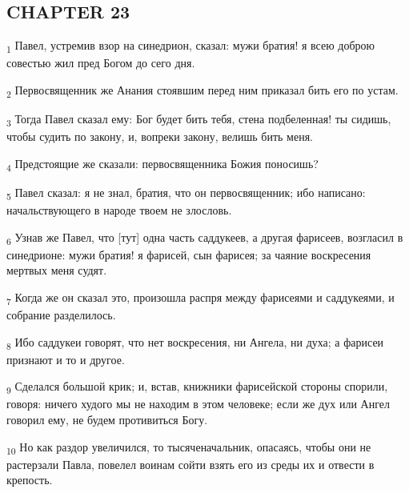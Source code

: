 \subsection{CHAPTER 23}
\begin{tcolorbox}
\textsubscript{1} Павел, устремив взор на синедрион, сказал: мужи братия! я всею доброю совестью жил пред Богом до сего дня.
\end{tcolorbox}
\begin{tcolorbox}
\textsubscript{2} Первосвященник же Анания стоявшим перед ним приказал бить его по устам.
\end{tcolorbox}
\begin{tcolorbox}
\textsubscript{3} Тогда Павел сказал ему: Бог будет бить тебя, стена подбеленная! ты сидишь, чтобы судить по закону, и, вопреки закону, велишь бить меня.
\end{tcolorbox}
\begin{tcolorbox}
\textsubscript{4} Предстоящие же сказали: первосвященника Божия поносишь?
\end{tcolorbox}
\begin{tcolorbox}
\textsubscript{5} Павел сказал: я не знал, братия, что он первосвященник; ибо написано: начальствующего в народе твоем не злословь.
\end{tcolorbox}
\begin{tcolorbox}
\textsubscript{6} Узнав же Павел, что [тут] одна часть саддукеев, а другая фарисеев, возгласил в синедрионе: мужи братия! я фарисей, сын фарисея; за чаяние воскресения мертвых меня судят.
\end{tcolorbox}
\begin{tcolorbox}
\textsubscript{7} Когда же он сказал это, произошла распря между фарисеями и саддукеями, и собрание разделилось.
\end{tcolorbox}
\begin{tcolorbox}
\textsubscript{8} Ибо саддукеи говорят, что нет воскресения, ни Ангела, ни духа; а фарисеи признают и то и другое.
\end{tcolorbox}
\begin{tcolorbox}
\textsubscript{9} Сделался большой крик; и, встав, книжники фарисейской стороны спорили, говоря: ничего худого мы не находим в этом человеке; если же дух или Ангел говорил ему, не будем противиться Богу.
\end{tcolorbox}
\begin{tcolorbox}
\textsubscript{10} Но как раздор увеличился, то тысяченачальник, опасаясь, чтобы они не растерзали Павла, повелел воинам сойти взять его из среды их и отвести в крепость.
\end{tcolorbox}
